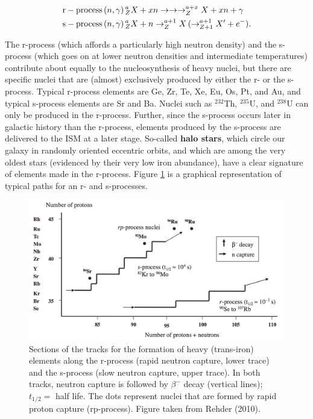 \documentclass[a4paper,10pt]{article}
\begin{document}
\begin{align*}
    {\rm r-process}\,(n,\gamma)\,&^a_ZX+xn \rightarrow\rightarrow\rightarrow ^{a+x}_ZX+xn + \gamma \\
    {\rm s-process}\,(n,\gamma)\,&^a_ZX+n \rightarrow ^{a+1}_ZX\,(\rightarrow^{a+1}_{Z+1}X'+e^-).
\end{align*}

{\noindent}The r-process (which affords a particularly high neutron density) and the s-process (which goes on at lower neutron densities and intermediate temperatures) contribute about equally to the nucleosynthesis of heavy nuclei, but there are specific nuclei that are (almost) exclusively produced by either the r- or the s-process. Typical r-process elements are Ge, Zr, Te, Xe, Eu, Os, Pt, and Au, and typical s-process elements are Sr and Ba. Nuclei such as $^{232}$Th, $^{235}$U, and $^{238}$U can only be produced in the r-process. Further, since the s-process occurs later in galactic history than the r-process, elements produced by the s-process are delivered to the ISM at a later stage. So-called \textbf{halo stars}, which circle our galaxy in randomly oriented eccentric orbits, and which are among the very oldest stars (evidenced by their very low iron abundance), have a clear signature of elements made in the r-process. Figure \ref{fig:rsprocesses} is a graphical representation of typical paths for an r- and s-processes.

\begin{figure}[t]
    \centering
    \includegraphics[width=14cm]{figures/rs-processes.png}
    \caption{\footnotesize{Sections of the tracks for the formation of heavy (trans-iron) elements along the r-process (rapid neutron capture, lower trace) and the s-process (slow neutron capture, upper trace). In both tracks, neutron capture is followed by $\beta^-$ decay (vertical lines); $t_{1/2}=$ half life. The dots represent nuclei that are formed by rapid proton capture (rp-process). Figure taken from Rehder (2010).}}
    \label{fig:rsprocesses}
\end{figure}
\end{document}
